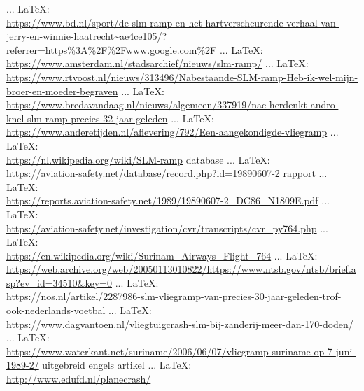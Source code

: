 \begin{thebibliography}{99}
{{{{{{{	 ... \LaTeX:\\ \url{https://www.bd.nl/sport/de-slm-ramp-en-het-hartverscheurende-verhaal-van-jerry-en-winnie-haatrecht~ae4ce105/?referrer=https%3A%2F%2Fwww.google.com%2F}
	 ... \LaTeX:\\ \url{https://www.amsterdam.nl/stadsarchief/nieuws/slm-ramp/}
	 ... \LaTeX:\\ \url{https://www.rtvoost.nl/nieuws/313496/Nabestaande-SLM-ramp-Heb-ik-wel-mijn-broer-en-moeder-begraven}
	 ... \LaTeX:\\ \url{https://www.bredavandaag.nl/nieuws/algemeen/337919/nac-herdenkt-andro-knel-slm-ramp-precies-32-jaar-geleden}
	 ... \LaTeX:\\ \url{https://www.anderetijden.nl/aflevering/792/Een-aangekondigde-vliegramp}
	 ... \LaTeX:\\ \url{https://nl.wikipedia.org/wiki/SLM-ramp}
	database
	 ... \LaTeX:\\ \url{https://aviation-safety.net/database/record.php?id=19890607-2}
	rapport
	 ... \LaTeX:\\ \url{https://reports.aviation-safety.net/1989/19890607-2_DC86_N1809E.pdf}
	 ... \LaTeX:\\ \url{https://aviation-safety.net/investigation/cvr/transcripts/cvr_py764.php}
	 ... \LaTeX:\\ \url{https://en.wikipedia.org/wiki/Surinam_Airways_Flight_764}
	 ... \LaTeX:\\ \url{https://web.archive.org/web/20050113010822/https://www.ntsb.gov/ntsb/brief.asp?ev_id=34510&key=0}
	 ... \LaTeX:\\ \url{https://nos.nl/artikel/2287986-slm-vliegramp-van-precies-30-jaar-geleden-trof-ook-nederlands-voetbal}
	 ... \LaTeX:\\ \url{https://www.dagvantoen.nl/vliegtuigcrash-slm-bij-zanderij-meer-dan-170-doden/}
	 ... \LaTeX:\\ \url{https://www.waterkant.net/suriname/2006/06/07/vliegramp-suriname-op-7-juni-1989-2/}
	uitgebreid engels artikel
	 ... \LaTeX:\\ \url{http://www.edufd.nl/planecrash/}
}}}}}}}
\end{thebibliography}
